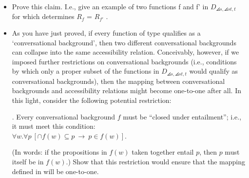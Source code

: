 \begin{exercise}
{	}
	\begin{itemize}
		
		\item Prove this claim. I.e., give an example of two functions f and f' in $D_{\angles{s,\angles{st,t}}}$ for which \Last determines $R_{f}$ = $R_{f'}$ .
		
		\item As you have just proved, if every function of type  qualifies as a `conversational background', then two different conversational backgrounds can collapse into the same accessibility relation. Conceivably, however, if we imposed further restrictions on conversational backgrounds (i.e., conditions by which only a proper subset of the functions in $D_{\angles{s,\angles{st,t}}}$ would qualify as conversational backgrounds), then the mapping between conversational backgrounds and accessibility relations might become one-to-one after all. In this light, consider the following potential restriction:
		
		\ex. Every conversational background $f$ must be ``closed under entailment''; i.e., it must meet this condition:\\
		$\forall w. \forall p\ [ \ensuremath{\cap}f(w) \ensuremath{\subseteq} p\ \rightarrow\ p \in f(w) ]$.
		
		(In words: if the propositions in $f(w)$ taken together entail $p$, then $p$ must itself be in $f(w)$.) Show that this restriction would ensure that the mapping defined in \LLast will be one-to-one. \eex
	\end{itemize}
\end{exercise}


